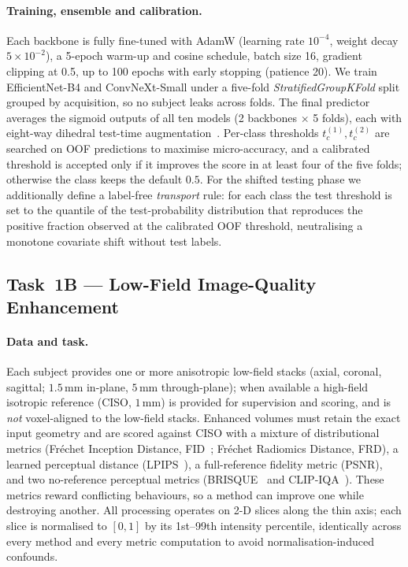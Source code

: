 \documentclass[runningheads]{llncs}
\begin{document}
\paragraph{Training, ensemble and calibration.}
Each backbone is fully fine-tuned with AdamW (learning rate $10^{-4}$, weight
decay $5\!\times\!10^{-2}$), a 5-epoch warm-up and cosine schedule, batch size 16,
gradient clipping at 0.5, up to 100 epochs with early stopping (patience 20). We
train EfficientNet-B4 and ConvNeXt-Small under a five-fold
\emph{StratifiedGroupKFold} split grouped by acquisition, so no subject leaks
across folds. The final predictor averages the sigmoid outputs of all ten models
(2 backbones $\times$ 5 folds), each with eight-way dihedral test-time
augmentation~\cite{lakshminarayanan2017simple}. Per-class thresholds
$t^{(1)}_c,t^{(2)}_c$ are searched on OOF predictions to maximise micro-accuracy,
and a calibrated threshold is accepted only if it improves the score in at least
four of the five folds; otherwise the class keeps the default $0.5$. For the
shifted testing phase we additionally define a label-free \emph{transport} rule:
for each class the test threshold is set to the quantile of the test-probability
distribution that reproduces the positive fraction observed at the calibrated OOF
threshold, neutralising a monotone covariate shift without test labels.

\subsection{Task~1B --- Low-Field Image-Quality Enhancement}
\label{sec:m1b}

\paragraph{Data and task.}
Each subject provides one or more anisotropic low-field stacks (axial, coronal,
sagittal; $1.5$\,mm in-plane, $5$\,mm through-plane); when available a high-field
isotropic reference (CISO, $1$\,mm) is provided for supervision and scoring, and
is \emph{not} voxel-aligned to the low-field stacks. Enhanced volumes must retain
the exact input geometry and are scored against CISO with a mixture of
distributional metrics (Fr\'echet Inception Distance, FID~\cite{heusel2017fid};
Fr\'echet Radiomics Distance, FRD), a learned perceptual distance
(LPIPS~\cite{zhang2018lpips}), a full-reference fidelity metric (PSNR), and two
no-reference perceptual metrics (BRISQUE~\cite{mittal2012brisque} and
CLIP-IQA~\cite{wang2023clipiqa}). These metrics reward conflicting behaviours, so
a method can improve one while destroying another. All processing operates on 2-D
slices along the thin axis; each slice is normalised to $[0,1]$ by its 1st--99th
intensity percentile, identically across every method and every metric
computation to avoid normalisation-induced confounds.
\end{document}
